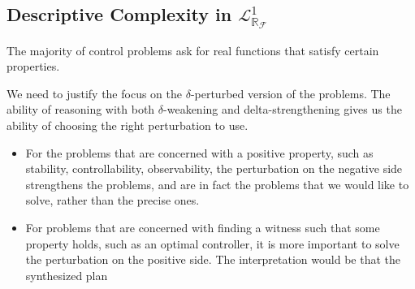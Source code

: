 \documentclass[11pt]{article}
\newcommand{\lrf}{\mathcal{L}_{\mathbb{R}_{\mathcal{F}}}}
\theoremstyle{definition}
\begin{document}
\subsection{Descriptive Complexity in $\lrf^1$} 

The majority of control problems ask for real functions that satisfy certain properties. 

We need to justify the focus on the $\delta$-perturbed version of the problems. The ability of reasoning with both $\delta$-weakening and delta-strengthening gives us the ability of choosing the right perturbation to use. 
\begin{itemize}
\item For the problems that are concerned with a positive property, such as stability, controllability, observability, the perturbation on the negative side strengthens the problems, and are in fact the problems that we would like to solve, rather than the precise ones. 
\item For problems that are concerned with finding a witness such that some property holds, such as an optimal controller, it is more important to solve the perturbation on the positive side. The interpretation would be that the synthesized plan 
\end{itemize}
\end{document}
